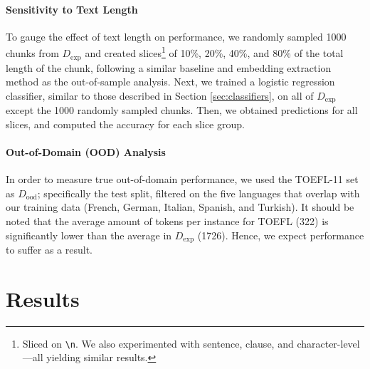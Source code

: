 \documentclass[10pt, a4paper]{article}
\begin{document}
\paragraph{Sensitivity to Text Length} To gauge the effect of text length on performance, we randomly sampled 1000 chunks from $D_\text{exp}$ and created slices\footnote{Sliced on \texttt{\textbackslash n}. We also experimented with sentence, clause, and character-level---all yielding similar results.} of 10\%, 20\%, 40\%, and 80\% of the total length of the chunk, following a similar baseline and embedding extraction method as the out-of-sample analysis. Next, we trained a logistic regression classifier, similar to those described in Section \ref{sec:classifiers}, on all of $D_\text{exp}$ except the 1000 randomly sampled chunks. Then, we obtained predictions for all slices, and computed the accuracy for each slice group.

\paragraph{Out-of-Domain (OOD) Analysis} \label{sec:out-of-domain} In order to measure true out-of-domain performance, we used the TOEFL-11 \cite{https://doi.org/10.1002/j.2333-8504.2013.tb02331.x} set as $D_\text{ood}$; specifically the test split, filtered on the five languages that overlap with our training data (French, German,  Italian, Spanish, and Turkish). It should be noted that the average amount of tokens per instance for TOEFL (322) is significantly lower than the average in $D_\text{exp}$ (1726). Hence, we expect performance to suffer as a result.

\section{Results} \label{sec:results}
\end{document}
